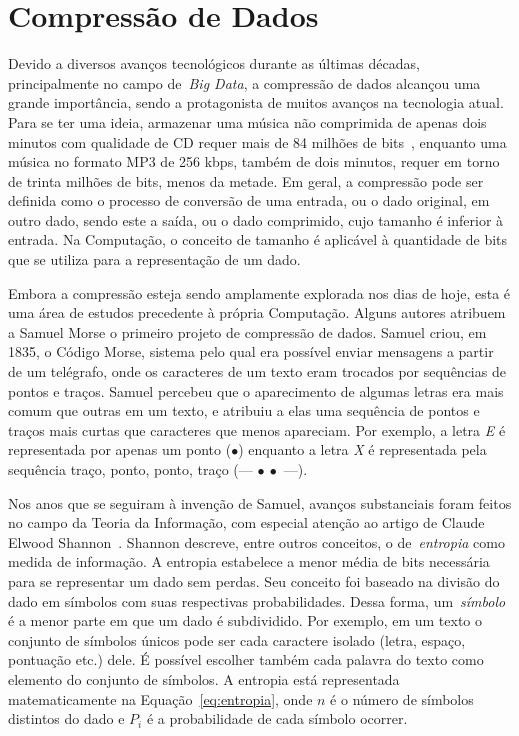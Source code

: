 \chapter{Compressão de Dados}
\label{chap:compressaodados}
Devido a diversos avanços tecnológicos durante as últimas décadas,
principalmente no campo de~\emph{Big Data}, a compressão de dados alcançou uma
grande importância, sendo a protagonista de muitos avanços na tecnologia atual.
Para se ter uma ideia, armazenar uma música não comprimida de apenas dois
minutos com qualidade de CD requer mais de 84 milhões de
bits~\citep{Book:IntroductionToDataCompression}, enquanto uma música no formato
MP3 de 256 kbps, também de dois minutos, requer em torno de trinta milhões de
bits, menos da metade. Em geral, a compressão pode ser definida como o
processo de conversão de uma entrada, ou o dado original, em outro dado, sendo
este a saída, ou o dado comprimido, cujo tamanho é inferior à entrada. Na
Computação, o conceito de tamanho é aplicável à quantidade de bits que se
utiliza para a representação de um dado.

Embora a compressão esteja sendo amplamente explorada nos dias de hoje, esta é
uma área de estudos precedente à própria Computação. Alguns autores atribuem a Samuel
Morse o primeiro projeto de compressão de dados. Samuel criou, em 1835,
o Código Morse, sistema pelo qual era possível enviar mensagens a partir de um telégrafo,
onde os caracteres de um texto eram trocados por sequências de pontos e traços.
Samuel percebeu que o aparecimento de algumas letras era mais comum que outras
em um texto, e atribuiu a elas uma sequência de pontos e traços mais curtas que
caracteres que menos apareciam. Por exemplo, a letra \emph{E} é representada por
apenas um ponto ($\bullet$) enquanto a letra \emph{X} é representada pela
sequência traço, ponto, ponto, traço (--- $\bullet~\bullet$ ---).

Nos anos que se seguiram à invenção de Samuel, avanços substanciais foram feitos
no campo da Teoria da Informação, com especial atenção ao artigo de Claude
Elwood Shannon~\citep{Artigo:EntropiaShannon}. Shannon descreve, entre outros
conceitos, o de~\emph{entropia} como medida de informação. A entropia estabelece
a menor média de bits necessária para se representar um dado sem perdas. Seu
conceito foi baseado na divisão do dado em símbolos com suas respectivas
probabilidades. Dessa forma, um~\emph{símbolo} é a menor parte em que um dado é
subdividido. Por exemplo, em um texto o conjunto de símbolos únicos pode ser
cada caractere isolado (letra, espaço, pontuação etc.) dele. É possível escolher
também cada palavra do texto como elemento do conjunto de símbolos. A entropia está
representada matematicamente na Equação~\ref{eq:entropia}, onde $n$ é o número
de símbolos distintos do dado e $P_i$ é a probabilidade de cada símbolo ocorrer.


